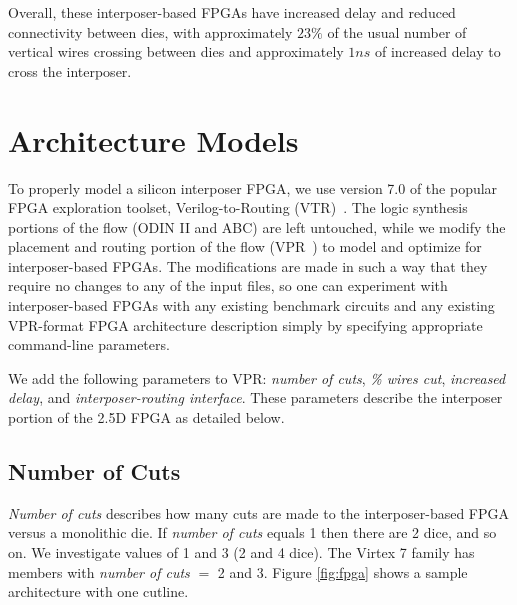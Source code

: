 \documentclass[journal]{IEEEtran}
\begin{document}
Overall, these interposer-based FPGAs have increased delay and reduced connectivity between dies, with approximately $23\%$ of the usual number of vertical wires crossing between dies and approximately $1ns$ of increased delay to cross the interposer.

\section{Architecture Models}
\label{archSection}
To properly model a silicon interposer FPGA, we use version 7.0 of the popular FPGA exploration toolset, Verilog-to-Routing (VTR)~\cite{luu2014vtr}. The logic synthesis portions of the flow (ODIN II and  ABC) are left untouched, while we modify the placement and routing portion of the flow (VPR~\cite{betz1997vpr}) to model and optimize for interposer-based FPGAs. The modifications are made in such a way that they require no changes to any of the input files, so one can experiment with interposer-based FPGAs with any existing benchmark circuits and any existing VPR-format FPGA architecture description simply by specifying appropriate command-line parameters.

We add the following parameters to VPR: \textit{number of cuts}, \textit{\% wires cut}, \textit{increased delay}, and \textit{interposer-routing interface}. These parameters describe the interposer portion of the 2.5D FPGA as detailed below.

\subsection{Number of Cuts}
\textit{Number of cuts} describes how many cuts are made to the interposer-based FPGA versus a monolithic die. If \textit{number of cuts} equals 1 then there are 2 dice, and so on. We investigate values of 1 and 3 (2 and 4 dice). The Virtex 7 family has members with \textit{number of cuts} $=$ 2 and 3. Figure \ref{fig:fpga} shows a sample architecture with one cutline.
\end{document}
